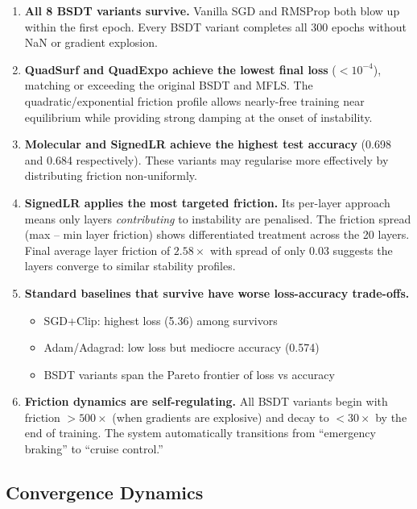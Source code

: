 \documentclass[11pt,a4paper]{article}
\begin{document}
\begin{enumerate}
  \item \textbf{All 8 BSDT variants survive.}  Vanilla SGD and RMSProp both blow up within the first epoch.  Every BSDT variant completes all 300 epochs without NaN or gradient explosion.

  \item \textbf{QuadSurf and QuadExpo achieve the lowest final loss} ($< 10^{-4}$), matching or exceeding the original BSDT and MFLS.  The quadratic/exponential friction profile allows nearly-free training near equilibrium while providing strong damping at the onset of instability.

  \item \textbf{Molecular and SignedLR achieve the highest test accuracy} (0.698 and 0.684 respectively).  These variants may regularise more effectively by distributing friction non-uniformly.

  \item \textbf{SignedLR applies the most targeted friction.}  Its per-layer approach means only layers \emph{contributing} to instability are penalised.  The friction spread (max -- min layer friction) shows differentiated treatment across the 20 layers.  Final average layer friction of $2.58\times$ with spread of only $0.03$ suggests the layers converge to similar stability profiles.

  \item \textbf{Standard baselines that survive have worse loss-accuracy trade-offs.}
  \begin{itemize}[nosep]
    \item SGD+Clip: highest loss (5.36) among survivors
    \item Adam/Adagrad: low loss but mediocre accuracy (0.574)
    \item BSDT variants span the Pareto frontier of loss vs accuracy
  \end{itemize}

  \item \textbf{Friction dynamics are self-regulating.}  All BSDT variants begin with friction $>500\times$ (when gradients are explosive) and decay to $< 30\times$ by the end of training.  The system automatically transitions from ``emergency braking'' to ``cruise control.''
\end{enumerate}

\subsection{Convergence Dynamics}
\end{document}
